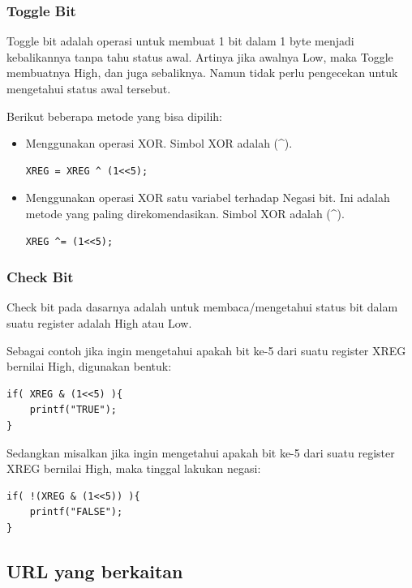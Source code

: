 \documentclass[12pt,]{article}
\begin{document}
	\subsubsection{Toggle Bit}

	Toggle bit adalah operasi untuk membuat 1 bit dalam 1 byte menjadi kebalikannya tanpa tahu status awal.
	Artinya jika awalnya Low, maka Toggle membuatnya High, dan juga sebaliknya.
	Namun tidak perlu pengecekan untuk mengetahui status awal tersebut.

	Berikut beberapa metode yang bisa dipilih:
	\begin{itemize}

		\item Menggunakan operasi XOR.
		Simbol XOR adalah (\^{}).
		\begin{verbatim}
XREG = XREG ^ (1<<5);
		\end{verbatim}

		\item Menggunakan operasi XOR satu variabel terhadap Negasi bit.
		Ini adalah metode yang paling direkomendasikan.
		Simbol XOR adalah (\^{}).
		\begin{verbatim}
XREG ^= (1<<5);
		\end{verbatim}
	\end{itemize}

	\subsubsection{Check Bit}

	Check bit pada dasarnya adalah untuk membaca/mengetahui status bit dalam suatu register adalah High atau Low.

	Sebagai contoh jika ingin mengetahui apakah bit ke-5 dari suatu register XREG bernilai High, digunakan bentuk:

	\begin{verbatim}
if( XREG & (1<<5) ){
	printf("TRUE");
}
	\end{verbatim}

	Sedangkan misalkan jika ingin mengetahui apakah bit ke-5 dari suatu register XREG bernilai High, maka tinggal lakukan negasi:
	\begin{verbatim}
if( !(XREG & (1<<5)) ){
	printf("FALSE");
}
	\end{verbatim}

	\subsection{URL yang berkaitan}
\end{document}
